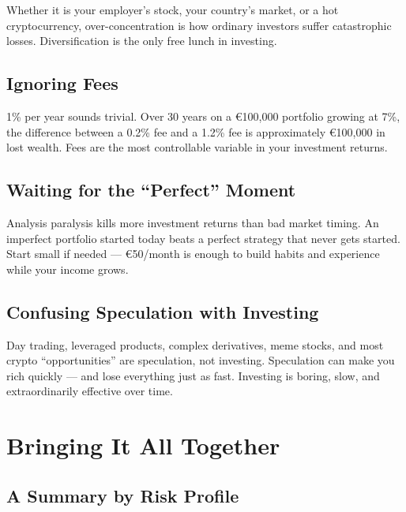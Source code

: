 \documentclass[12pt, a4paper]{book}
\begin{document}
Whether it is your employer's stock, your country's market, or a hot cryptocurrency, over-concentration is how ordinary investors suffer catastrophic losses. Diversification is the only free lunch in investing.

\section{Ignoring Fees}

1\% per year sounds trivial. Over 30 years on a \euro{}100{,}000 portfolio growing at 7\%, the difference between a 0.2\% fee and a 1.2\% fee is approximately \euro{}100{,}000 in lost wealth. Fees are the most controllable variable in your investment returns.

\section{Waiting for the ``Perfect'' Moment}

Analysis paralysis kills more investment returns than bad market timing. An imperfect portfolio started today beats a perfect strategy that never gets started. Start small if needed --- \euro{}50/month is enough to build habits and experience while your income grows.

\section{Confusing Speculation with Investing}

Day trading, leveraged products, complex derivatives, meme stocks, and most crypto ``opportunities'' are speculation, not investing. Speculation can make you rich quickly --- and lose everything just as fast. Investing is boring, slow, and extraordinarily effective over time.

\chapter{Bringing It All Together}

\section{A Summary by Risk Profile}
\end{document}
